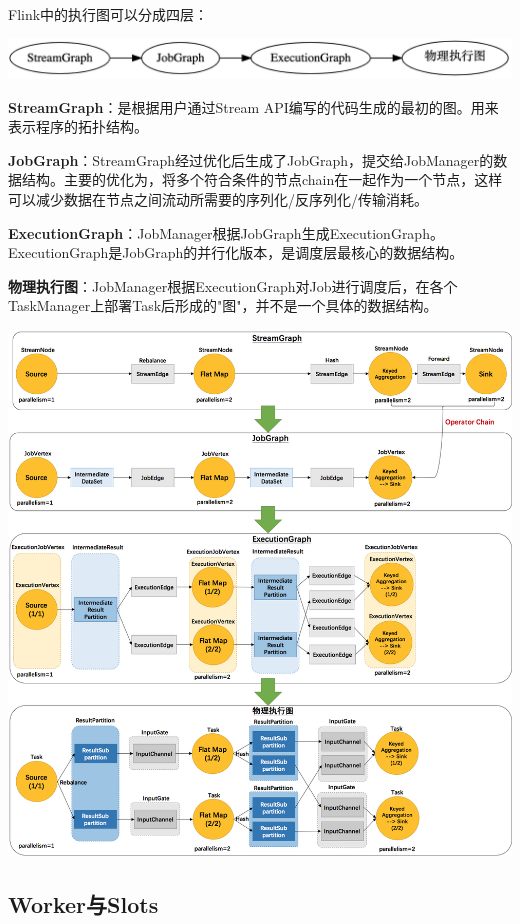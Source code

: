 \documentclass{ctexart}
\begin{document}
Flink中的执行图可以分成四层：

\includegraphics[width=\textwidth]{dot-example1.png}

\textbf{StreamGraph}：是根据用户通过Stream API编写的代码生成的最初的图。用来表示程序的拓扑结构。

\textbf{JobGraph}：StreamGraph经过优化后生成了JobGraph，提交给JobManager的数据结构。主要的优化为，将多个符合条件的节点chain在一起作为一个节点，这样可以减少数据在节点之间流动所需要的序列化/反序列化/传输消耗。

\textbf{ExecutionGraph}：JobManager根据JobGraph生成ExecutionGraph。ExecutionGraph是JobGraph的并行化版本，是调度层最核心的数据结构。

\textbf{物理执行图}：JobManager根据ExecutionGraph对Job进行调度后，在各个TaskManager上部署Task后形成的"图"，并不是一个具体的数据结构。

\includegraphics[width=\textwidth]{jobgraph.png}

\subsection{Worker与Slots}
\end{document}

